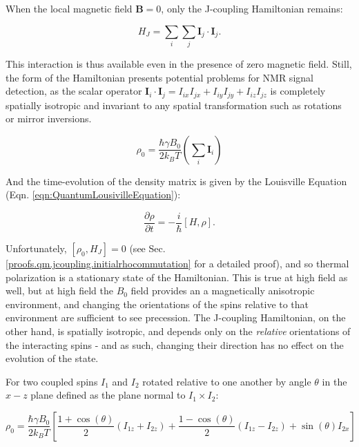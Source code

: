 \documentclass[PaulGanssle-Thesis.tex]{subfiles}
\begin{document}
When the local magnetic field $\mathbf{B} = 0$, only the  J-coupling Hamiltonian remains:

\begin{equation}
\label{eqn:JCouplingHamiltonian}
H_{J} = \sum_{i}\sum_{j}\mathbf{I}_{j}\cdot\mathbf{I}_{j}.
\end{equation}

This interaction is thus available even in the presence of zero magnetic field. Still, the form of the Hamiltonian presents potential problems for NMR signal detection, as the scalar operator $\mathbf{I}_{i}\cdot\mathbf{I}_{j} = I_{ix}I_{jx} + I_{iy}I_{jy} + I_{iz}I_{jz}$ is completely spatially isotropic and invariant to any spatial transformation such as rotations or mirror inversions. 

\begin{equation}
\label{eqn:InitialDensityMatrix}
\rho_{0} = \frac{\hbar \gamma B_{0}}{2k_{B}T}\left(\sum_{i}\mathbf{I}_{i}\right)
\end{equation}

And the time-evolution of the density matrix is given by the Louisville Equation (Eqn. \ref{eqn:QuantumLousivilleEquation}):

\begin{equation}
\label{eqn:QuantumLousivilleEquation}
\frac{\partial \rho}{\partial t} = -\frac{i}{\hbar}\left[H, \rho\right].
\end{equation}

Unfortunately, $\left[\rho_{0}, H_{J}\right] = 0$ (see Sec. \ref{proofs.qm.jcoupling.initialrhocommutation} for a detailed proof), and so thermal polarization is a stationary state of the Hamiltonian. This is true at high field as well, but at high field the $B_{0}$ field provides an a magnetically anisotropic environment, and changing the orientations of the spins relative to that environment are sufficient to see precession. The J-coupling Hamiltonian, on the other hand, is spatially isotropic, and depends only on the \textit{relative} orientations of the interacting spins - and as such, changing their direction has no effect on the evolution of the state. 

For two coupled spins $I_1$ and $I_2$ rotated relative to one another by angle $\theta$ in the $x-z$ plane defined as the plane normal to $I_{1}\times I_{2}$:

\begin{equation}
\label{eqn:TwoSpinsThetaRotation}
\rho_{0} = \frac{\hbar\gamma B_{0}}{2k_{B}T}\left[\frac{1 + \cos(\theta)}{2}(I_{1z} + I_{2z}) + \frac{1 - \cos(\theta)}{2}\left(I_{1z} - I_{2z}\right) + \sin(\theta)I_{2x}\right]
\end{equation}
\end{document}
